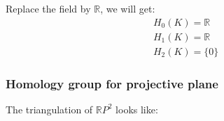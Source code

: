 \documentclass[]{ctexart}
\begin{document}
		Replace the field by $\mathbb{R}$, we will get:
			\begin{equation*}
			\begin{aligned}
				&H_0(K)=\mathbb{R}\\
				&H_1(K)=\mathbb{R}\\
				&H_2(K)=\{0\}
			\end{aligned}
			\end{equation*}
			
		\subsubsection{Homology group for projective plane}
			The triangulation of $\mathbb{R}P^2$ looks like:
				\begin{center}
					
					
					
					\begin{tikzpicture}[x=0.75pt,y=0.75pt,yscale=-1,xscale=1]
					

\end{tikzpicture}
\end{center}
\end{document}
